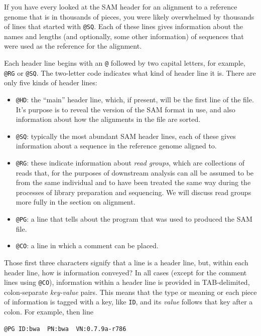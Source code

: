 \documentclass[]{krantz}
\providecommand{\tightlist}{%
  \setlength{\itemsep}{0pt}\setlength{\parskip}{0pt}}
\begin{document}
If you have every looked at the SAM header for an alignment to a reference genome
that is in thousands of pieces, you were likely overwhelmed by thousands of
lines that started with \texttt{@SQ}. Each of these lines gives information about the
names and lengths (and optionally, some other information) of sequences that
were used as the reference for the alignment.

Each header line begins with an \texttt{@} followed by two capital letters, for example,
\texttt{@RG} or \texttt{@SQ}. The two-letter code indicates what kind of header line it is. There are only
five kinds of header lines:

\begin{itemize}
\tightlist
\item
  \texttt{@HD}: the ``main'' header line, which, if present, will be the first line of the
  file. It's purpose is to reveal the version of the SAM format in use, and also information
  about how the alignments in the file are sorted.
\item
  \texttt{@SQ}: typically the most abundant SAM header lines, each of these gives information about
  a sequence in the reference genome aligned to.
\item
  \texttt{@RG}: these indicate information about \emph{read groups}, which are collections of reads that,
  for the purposes of downstream analysis can all be assumed to be from the same individual and
  to have been treated the same way during the processes of library preparation and sequencing.
  We will discuss read groups more fully in the section on alignment.
\item
  \texttt{@PG}: a line that tells about the program that was used to produced the SAM file.
\item
  \texttt{@CO}: a line in which a comment can be placed.
\end{itemize}

Those first three characters signify that a line is a header line, but, within each
header line, how is information conveyed? In all cases (except for the comment lines
using \texttt{@CO}), information within a header line is provided in TAB-delimited, colon-separate
\emph{key-value} pairs. This means that the type or meaning or each piece of information is tagged
with a key, like \texttt{ID}, and its \emph{value} follows that key after a colon. For example, then line

\begin{verbatim}
@PG ID:bwa  PN:bwa  VN:0.7.9a-r786
\end{verbatim}
\end{document}
